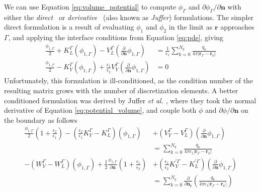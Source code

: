 We can use Equation \eqref{eq:volume_potential} to compute $\phi_\Gamma$ and $\partial\phi_\Gamma/\partial\mathbf{n}$ with either the \emph{direct}~\cite{YoonLenhoff1990} or \emph{derivative}~\cite{JufferETal1991} (also known as \emph{Juffer}) formulations.
The simpler direct formulation is a result of evaluating $\phi_1$ and $\phi_2$ in the limit as $\mathbf{r}$ approaches $\Gamma$, and applying the interface conditions from Equation \eqref{eq:pde}, giving
%
\begin{align} \label{eq:direct}
\frac{\phi_{1,\Gamma}}{2}+ K_{L}^{\Gamma}(\phi_{1,\Gamma}) -  V_{L}^{\Gamma} \left(\frac{\partial}{\partial \mathbf{n}}  \phi_{1,\Gamma}  \right) & = \frac{1}{\epsilon_1} \sum_{k=0}^{N_q}  \frac{q_k}{4\pi|\mathbf{r}_{\Gamma} - \mathbf{r}_k|} \nonumber \\
\frac{\phi_{1,\Gamma}}{2} - K_{Y}^{\Gamma}(\phi_{1,\Gamma}) + \frac{\epsilon_1}{\epsilon_2}V_{Y}^{\Gamma} \left( \frac{\partial}{\partial \mathbf{n}} \phi_{1,\Gamma} \right) & = 0
\end{align}
%
Unfortunately, this formulation is ill-conditioned, as the condition number of the resulting matrix grows with the number of discretization elements. 
A better conditioned formulation was derived by Juffer \emph{et al.} \cite{JufferETal1992}, where they took the normal derivative of Equation \eqref{eq:potential_volume}, and couple both $\phi$ and $\partial\phi/\partial\mathbf{n}$ on the boundary as follows
%
\begin{align}\label{eq:juffer}
\frac{\phi_{1,\Gamma}}{2}\left(1+\frac{\epsilon_2}{\epsilon_1}\right) - \left(\frac{\epsilon_2}{\epsilon_1}K_Y^\Gamma - K_L^\Gamma\right)(\phi_{1,\Gamma}) &+ \left(V_Y^\Gamma - V_L^\Gamma\right)\left( \frac{\partial}{\partial \mathbf{n}} \phi_{1,\Gamma} \right)\nonumber\\ 
&= \sum_{k=0}^{N_q}  \frac{q_k}{4\pi\epsilon_1|\mathbf{r}_{\Gamma} - \mathbf{r}_k|} \nonumber \\
- \left(W_Y^\Gamma - W_L^\Gamma\right)(\phi_{1,\Gamma}) +  \frac{1}{2}\frac{\phi_{1,\Gamma}}{\partial\mathbf{n}}\left(1+\frac{\epsilon_1}{\epsilon_2}\right) &+ \left(\frac{\epsilon_1}{\epsilon_2}K_Y^{\prime\Gamma} - K_L^{\prime\Gamma}\right)\left( \frac{\partial}{\partial \mathbf{n}} \phi_{1,\Gamma} \right)\nonumber\\ 
&= \sum_{k=0}^{N_q}  \frac{\partial}{\partial\mathbf{n}_\mathbf{r}}\left(\frac{q_k}{4\pi\epsilon_1|\mathbf{r}_{\Gamma} - \mathbf{r}_k|}\right) \nonumber \\
\end{align}
